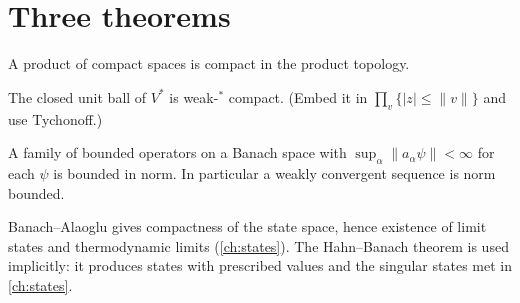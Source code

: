 \section{Three theorems}
\begin{theorem}[Tychonoff]
A product of compact spaces is compact in the product topology.
\end{theorem}
\begin{theorem}
The closed unit ball of $V^*$ is weak-$^*$ compact. (Embed it in $\prod_{v}\{|z|\le\|v\|\}$ and use Tychonoff.)
\end{theorem}
\begin{theorem}
A family of bounded operators on a Banach space with $\sup_\alpha\|a_\alpha\psi\|<\infty$ for each $\psi$ is bounded in norm. In particular a weakly convergent sequence is norm bounded.
\end{theorem}
Banach--Alaoglu gives compactness of the state space, hence existence of limit states and thermodynamic limits (\cref{ch:states}). The Hahn--Banach theorem is used implicitly: it produces states with prescribed values and the singular states met in \cref{ch:states}.

